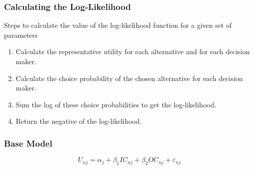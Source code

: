 \documentclass{beamer}\usepackage[]{graphicx}\usepackage[]{color}
\begin{document}
\begin{frame}\frametitle{Calculating the Log-Likelihood}
    Steps to calculate the value of the log-likelihood function for a given set of parameters
    \begin{enumerate}
    	\item Calculate the representative utility for each alternative and for each decision maker.
		\item Calculate the choice probability of the chosen alternative for each decision maker.
		\item Sum the log of these choice probabilities to get the log-likelihood.
		\item Return the negative of the log-likelihood.
    \end{enumerate}
\end{frame}

\begin{frame}\frametitle{Base Model}
    $$U_{nj} = \alpha_j + \beta_1 IC_{nj} + \beta_2 OC_{nj} + \varepsilon_{nj}$$
\end{frame}
\end{document}
